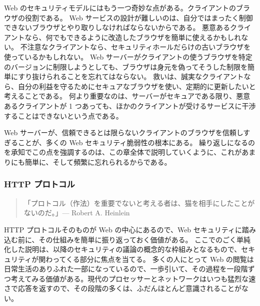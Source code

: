 \documentclass[uplatex]{jsarticle}
\def\label#1{}%
\begin{document}
Web のセキュリティモデルにはもう一つ奇妙な点がある。クライアントのブラウザの役割である。
Web サービスの設計が難しいのは、自分ではまったく制御できないブラウザとやり取りしなければならないからである。
悪意あるクライアントなら、何でもできるように改造したブラウザを簡単に使えるかもしれない。
不注意なクライアントなら、セキュリティホールだらけの古いブラウザを使っているかもしれない。
Web サーバーがクライアントの使うブラウザを特定のバージョンに制限しようとしても、ブラウザは身元を偽ってそうした制限を簡単にすり抜けられることを忘れてはならない。
救いは、誠実なクライアントなら、自分の利益を守るためにセキュアなブラウザを使い、定期的に更新したいと考えることである。
何より重要なのは、サーバーがセキュアである限り、悪意あるクライアントが 1 つあっても、ほかのクライアントが受けるサービスに干渉することはできないという点である。

\begin{rem}[クライアントのブラウザを信頼しすぎない]\label{rem:ch11-overtrusting-browsers}
Web サーバーが、信頼できるとは限らないクライアントのブラウザを信頼しすぎることが、多くの Web セキュリティ脆弱性の根本にある。
繰り返しになるのを承知でこの点を強調するのは、この章全体で説明していくように、これがあまりにも簡単に、そして頻繁に忘れられるからである。
\end{rem}

\subsubsection{HTTP プロトコル}\label{subsec:ch11-http}

\begin{quote}
「プロトコル（作法）を重要でないと考える者は、猫を相手にしたことがないのだ。」\hfill --- Robert A. Heinlein
\end{quote}

HTTP プロトコルそのものが Web の中心にあるので、Web セキュリティに踏み込む前に、その仕組みを簡単に振り返っておく価値がある。
ここでのごく単純化した説明は、以降のセキュリティの議論の概念的な枠組みとなるもので、セキュリティが関わってくる部分に焦点を当てる。
多くの人にとって Web の閲覧は日常生活のありふれた一部になっているので、一歩引いて、その過程を一段階ずつ考えてみる価値がある。現代のプロセッサーとネットワークはいつも猛烈な速さで応答を返すので、その段階の多くは、ふだんほとんど意識されることがない。
\end{document}
